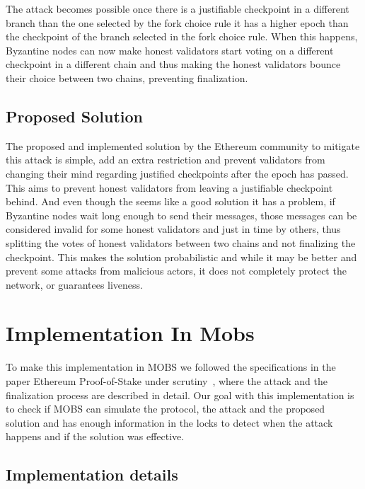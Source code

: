 The attack becomes possible once there is a justifiable checkpoint in a different branch than the one selected by the fork choice rule it has a
higher epoch than the checkpoint of the branch selected in the fork choice rule. When this happens, Byzantine nodes can now
make honest validators start voting on a different checkpoint in a different chain and thus making the honest validators
bounce their choice between two chains, preventing finalization.


\subsection{Proposed Solution}\label{sub:proposed_patch}

The proposed and implemented solution by the Ethereum community to mitigate this attack is simple, add an extra restriction
and prevent validators from changing their mind regarding justified checkpoints after the epoch has passed. This aims to prevent
honest validators from leaving a justifiable checkpoint behind. And even though the seems like a good solution it has a problem,
if Byzantine nodes wait long enough to send their messages, those messages can be considered invalid for some honest validators and
just in time by others, thus splitting the votes of honest validators between two chains and not finalizing the checkpoint. This
makes the solution probabilistic and while it may be better and prevent some attacks from malicious actors, it does not completely
protect the network, or guarantees liveness.


\section{Implementation In Mobs}\label{sub:implementation_in_mobs}

To make this implementation in MOBS we followed the specifications in the paper Ethereum Proof-of-Stake under scrutiny~\cite{ethereum_analysis},
 where the attack and the finalization process are described in detail. Our goal with this implementation is to check if MOBS can simulate
the protocol, the attack and the proposed solution and has enough information in the locks to detect when the attack happens and
if the solution was effective.

\subsection{Implementation details}\label{sub:implementation_details}

